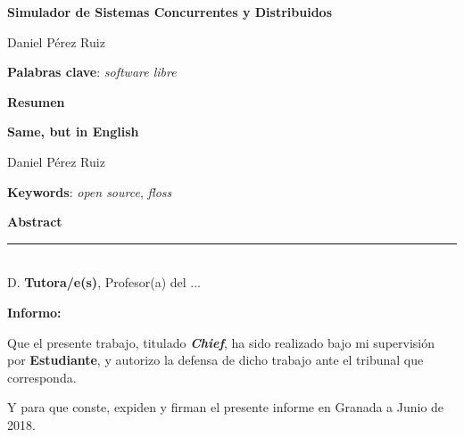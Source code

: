 \thispagestyle{empty}

\begin{center}
{\large\bfseries Simulador de Sistemas Concurrentes y Distribuidos }\\
\end{center}
\begin{center}
Daniel Pérez Ruiz\\
\end{center}


\vspace{0.5cm}
\noindent\textbf{Palabras clave}: \textit{software libre}
\vspace{0.7cm}

\noindent\textbf{Resumen}\\
	

\cleardoublepage

\begin{center}
	{\large\bfseries Same, but in English}\\
\end{center}
\begin{center}
	Daniel Pérez Ruiz\\
\end{center}
\vspace{0.5cm}
\noindent\textbf{Keywords}: \textit{open source}, \textit{floss}
\vspace{0.7cm}

\noindent\textbf{Abstract}\\


\cleardoublepage

\thispagestyle{empty}

\noindent\rule[-1ex]{\textwidth}{2pt}\\[4.5ex]

D. \textbf{Tutora/e(s)}, Profesor(a) del ...

\vspace{0.5cm}

\textbf{Informo:}

\vspace{0.5cm}

Que el presente trabajo, titulado \textit{\textbf{Chief}},
ha sido realizado bajo mi supervisión por \textbf{Estudiante}, y autorizo la defensa de dicho trabajo ante el tribunal
que corresponda.

\vspace{0.5cm}

Y para que conste, expiden y firman el presente informe en Granada a Junio de 2018.

